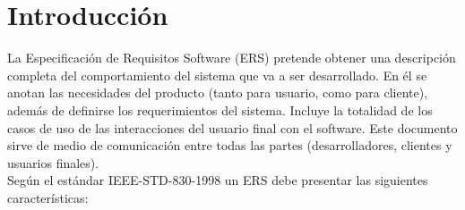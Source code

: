 
\section{Introducción}

La Especificación de Requisitos Software (ERS) pretende obtener una descripción completa del comportamiento del sistema que va a ser desarrollado. 
En él se anotan las necesidades del producto (tanto para usuario, como para cliente), además de definirse los requerimientos del sistema. 
Incluye la totalidad de los casos de uso de las interacciones del usuario final con el software.
Este documento sirve de medio de comunicación entre todas las partes (desarrolladores, clientes y usuarios finales).\\

Según el estándar IEEE-STD-830-1998 \cite{ieee830} un ERS debe presentar las siguientes características:

